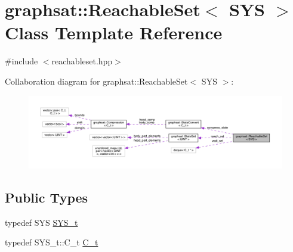 \hypertarget{classgraphsat_1_1_reachable_set}{}\section{graphsat\+::Reachable\+Set$<$ S\+YS $>$ Class Template Reference}
\label{classgraphsat_1_1_reachable_set}


{\ttfamily \#include $<$reachableset.\+hpp$>$}



Collaboration diagram for graphsat\+::Reachable\+Set$<$ S\+YS $>$\+:
\nopagebreak
\begin{figure}[H]
\begin{center}
\leavevmode
\includegraphics[width=350pt]{classgraphsat_1_1_reachable_set__coll__graph}
\end{center}
\end{figure}
\subsection*{Public Types}
\begin{DoxyCompactItemize}
\item 
typedef S\+YS \mbox{\hyperlink{classgraphsat_1_1_reachable_set_a28cb7ce6be4d0a31c7249085f09432c5}{S\+Y\+S\+\_\+t}}
\item 
typedef S\+Y\+S\+\_\+t\+::\+C\+\_\+t \mbox{\hyperlink{classgraphsat_1_1_reachable_set_a0b7981a216ec4c46be913e08d5f0cd07}{C\+\_\+t}}
\end{DoxyCompactItemize}
